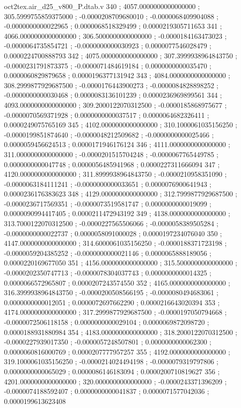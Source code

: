 \begin{filecontents}[overwrite]{oct2tex.air_d25_v800_P.dtab.v}
340 ; 4057.0000000000000000 ; 305.5999755859375000 ; -0.0000208709680010 ; -0.0000068409904088 ; -0.0000000000022965 ; 0.0000068518329499 ; 0.0000219305711653
341 ; 4066.0000000000000000 ; 306.5000000000000000 ; -0.0000184163473023 ; -0.0000064735854721 ; -0.0000000000030923 ; 0.0000077546028479 ; 0.0000224700888793
342 ; 4075.0000000000000000 ; 307.3999938964843750 ; -0.0000231791873375 ; -0.0000071484619184 ; 0.0000000000035470 ; 0.0000060829879658 ; 0.0000196377131942
343 ; 4084.0000000000000000 ; 308.2999877929687500 ; -0.0000176443900273 ; -0.0000084828898252 ; -0.0000000000030468 ; 0.0000083136101239 ; 0.0000236969899561
344 ; 4093.0000000000000000 ; 309.2000122070312500 ; -0.0000185868975677 ; -0.0000070569371928 ; 0.0000000000037517 ; 0.0000064682326411 ; 0.0000249075765169
345 ; 4102.0000000000000000 ; 310.1000061035156250 ; -0.0000199851874640 ; -0.0000048212509682 ; -0.0000000000025466 ; 0.0000059456624513 ; 0.0000171946176124
346 ; 4111.0000000000000000 ; 311.0000000000000000 ; -0.0000201515704248 ; -0.0000067765449785 ; 0.0000000000047748 ; 0.0000056485941968 ; 0.0000227311666094
347 ; 4120.0000000000000000 ; 311.8999938964843750 ; -0.0000210958351090 ; -0.0000063184111241 ; -0.0000000000033651 ; 0.0000076900641943 ; 0.0000236176383623
348 ; 4129.0000000000000000 ; 312.7999877929687500 ; -0.0000236717569351 ; -0.0000073519581747 ; 0.0000000000019099 ; 0.0000090994417405 ; 0.0000211472943192
349 ; 4138.0000000000000000 ; 313.7000122070312500 ; -0.0000227565506066 ; -0.0000058389505284 ; -0.0000000000022737 ; 0.0000058091000028 ; 0.0000197234076040
350 ; 4147.0000000000000000 ; 314.6000061035156250 ; -0.0000188371723198 ; -0.0000059204385252 ; -0.0000000000021146 ; 0.0000065888189056 ; 0.0000220169677050
351 ; 4156.0000000000000000 ; 315.5000000000000000 ; -0.0000202350747713 ; -0.0000078304037743 ; 0.0000000000014325 ; 0.0000066572965807 ; 0.0000207243574550
352 ; 4165.0000000000000000 ; 316.3999938964843750 ; -0.0000200508566195 ; -0.0000080494683061 ; 0.0000000000012051 ; 0.0000072697662290 ; 0.0000216643020394
353 ; 4174.0000000000000000 ; 317.2999877929687500 ; -0.0000197050794668 ; -0.0000072506118158 ; 0.0000000000029104 ; 0.0000069872098720 ; 0.0000188931880984
354 ; 4183.0000000000000000 ; 318.2000122070312500 ; -0.0000227939017350 ; -0.0000057248507801 ; 0.0000000000062300 ; 0.0000060816000769 ; 0.0000207777957257
355 ; 4192.0000000000000000 ; 319.1000061035156250 ; -0.0000214024494198 ; -0.0000079319797806 ; 0.0000000000065029 ; 0.0000086146183094 ; 0.0000200710819627
356 ; 4201.0000000000000000 ; 320.0000000000000000 ; -0.0000243371396209 ; -0.0000074188592407 ; 0.0000000000041837 ; 0.0000071577042036 ; 0.0000199613623408

\end{filecontents}
